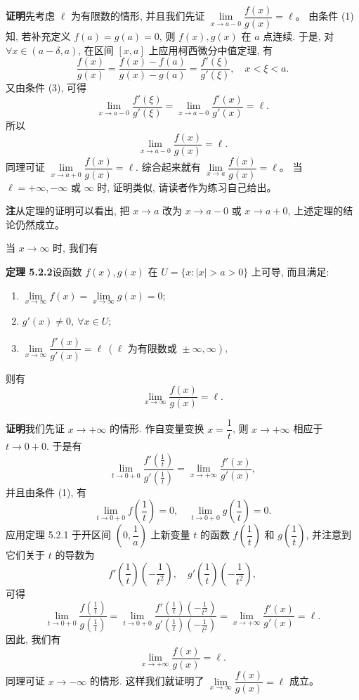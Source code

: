 \documentclass[UTF8,12pt,a4paper,fontset=fandol]{ctexart}
\begin{document}
\noindent\textbf{证明}\quad 先考虑 $\ell$ 为有限数的情形, 并且我们先证 $\lim\limits_{x\to a-0}\dfrac{f(x)}{g(x)}=\ell$。
由条件 (1) 知, 若补充定义 $f(a)=g(a)=0$, 则 $f(x),g(x)$ 在 $a$ 点连续. 于是, 对 $\forall x\in(a-\delta,a)$, 在区间 $[x,a]$ 上应用柯西微分中值定理, 有
\[
  \frac{f(x)}{g(x)}
  =
  \frac{f(x)-f(a)}{g(x)-g(a)}
  =
  \frac{f'(\xi)}{g'(\xi)},\quad x<\xi<a.
\]
又由条件 (3), 可得
\[
  \lim_{x\to a-0}\frac{f'(\xi)}{g'(\xi)}
  =
  \lim_{x\to a-0}\frac{f'(x)}{g'(x)}
  =
  \ell.
\]
所以
\[
  \lim_{x\to a-0}\frac{f(x)}{g(x)}=\ell.
\]
同理可证 $\lim\limits_{x\to a+0}\dfrac{f(x)}{g(x)}=\ell$. 综合起来就有 $\lim\limits_{x\to a}\dfrac{f(x)}{g(x)}=\ell$。
当 $\ell=+\infty,-\infty$ 或 $\infty$ 时, 证明类似, 请读者作为练习自己给出。

\noindent\textbf{注}\quad 从定理的证明可以看出, 把 $x\to a$ 改为 $x\to a-0$ 或 $x\to a+0$, 上述定理的结论仍然成立。

当 $x\to\infty$ 时, 我们有

\noindent\textbf{定理 5.2.2}\quad 设函数 $f(x),g(x)$ 在 $U=\{x: |x|>a>0\}$ 上可导, 而且满足:
\begin{enumerate}
  \item $\lim\limits_{x\to\infty}f(x)=\lim\limits_{x\to\infty}g(x)=0$;
  \item $g'(x)\ne0,\ \forall x\in U$;
  \item $\lim\limits_{x\to\infty}\dfrac{f'(x)}{g'(x)}=\ell\ (\ell\text{ 为有限数或 }\pm\infty,\infty)$,
\end{enumerate}
则有
\[
  \lim_{x\to\infty}\frac{f(x)}{g(x)}=\ell.
\]

\noindent\textbf{证明}\quad 我们先证 $x\to+\infty$ 的情形. 作自变量变换 $x=\dfrac1t$, 则 $x\to+\infty$ 相应于 $t\to0+0$. 于是有
\[
  \lim_{t\to0+0}
  \frac{f'\left(\frac1t\right)}
       {g'\left(\frac1t\right)}
  =
  \lim_{x\to+\infty}\frac{f'(x)}{g'(x)},
\]
并且由条件 (1), 有
\[
  \lim_{t\to0+0}f\left(\frac1t\right)=0,\quad
  \lim_{t\to0+0}g\left(\frac1t\right)=0.
\]
应用定理 5.2.1 于开区间 $\left(0,\dfrac1a\right)$ 上新变量 $t$ 的函数 $f\left(\dfrac1t\right)$ 和 $g\left(\dfrac1t\right)$, 并注意到它们关于 $t$ 的导数为
\[
  f'\left(\frac1t\right)\left(-\frac1{t^2}\right),\quad
  g'\left(\frac1t\right)\left(-\frac1{t^2}\right),
\]
可得
\[
  \lim_{t\to0+0}
  \frac{f\left(\frac1t\right)}
       {g\left(\frac1t\right)}
  =
  \lim_{t\to0+0}
  \frac{f'\left(\frac1t\right)\left(-\frac1{t^2}\right)}
       {g'\left(\frac1t\right)\left(-\frac1{t^2}\right)}
  =
  \lim_{x\to+\infty}\frac{f'(x)}{g'(x)}
  =
  \ell.
\]
因此, 我们有
\[
  \lim_{x\to+\infty}\frac{f(x)}{g(x)}=\ell.
\]
同理可证 $x\to-\infty$ 的情形. 这样我们就证明了 $\lim\limits_{x\to\infty}\dfrac{f(x)}{g(x)}=\ell$ 成立。
\end{document}
